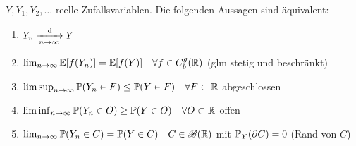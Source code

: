 \begin{proposition}
	$Y,Y_1,Y_2, \dots$ reelle Zufallsvariablen. Die folgenden Aussagen sind äquivalent:
	\begin{enumerate}
		\item $Y_n \konverteil Y$
		\item $\lim_{n \to \infty} \E[f(Y_n)] = \E[f(Y)] \quad \forall f \in C_b^g(\R)$ (glm stetig und beschränkt)
		\item $\limsup_{n \to \infty} \P(Y_n \in F) \le \P(Y \in F) \quad \forall F \subset \R$ abgeschlossen
		\item $\liminf_{n \to \infty} \P(Y_n \in O) \ge \P(Y \in O) \quad \forall O \subset \R$ offen
		\item $\lim_{n \to \infty} \P(Y_n \in C) = \P(Y \in C) \quad C \in \borel(\R)$ mit $\P_Y(\partial C) = 0$ (Rand von $C$)
	\end{enumerate}
\end{proposition}
